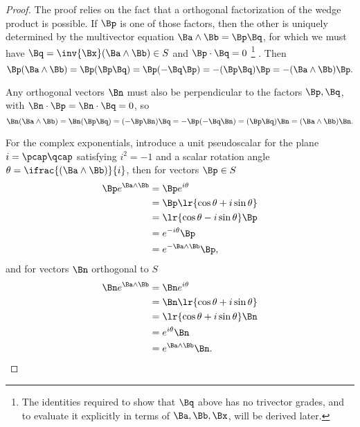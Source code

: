 \begin{proof}
The proof relies on the fact that a orthogonal factorization of the wedge product is possible.
If \( \Bp \) is one of those factors, then the other is uniquely determined by the multivector equation \( \Ba \wedge \Bb = \Bp \Bq \), for which we must have \( \Bq = \inv{\Bx}(\Ba \wedge \Bb) \in S \) and \( \Bp \cdot \Bq = 0 \)
\footnote{The identities required to show that \( \Bq \) above has no trivector grades, and to evaluate it explicitly in terms of \( \Ba, \Bb, \Bx \), will be derived later.}
.
Then
\begin{dmath}\label{eqn:generalRotation:1780}
\Bp (\Ba \wedge \Bb)
= \Bp (\Bp \Bq)
= \Bp (-\Bq \Bp)
= -(\Bp \Bq) \Bp
=
-(\Ba \wedge \Bb) \Bp.
\end{dmath}

Any orthogonal vectors \( \Bn \) must also be perpendicular to the factors \( \Bp, \Bq \), with \( \Bn \cdot \Bp = \Bn \cdot \Bq = 0 \), so
\begin{dmath}\label{eqn:generalRotation:1800}
\Bn (\Ba \wedge \Bb)
= \Bn (\Bp \Bq)
= (-\Bp \Bn) \Bq
= -\Bp (-\Bq \Bn)
= (\Bp \Bq) \Bn
=
(\Ba \wedge \Bb) \Bn.
\end{dmath}

For the complex exponentials, introduce a unit pseudoscalar for the plane \( i = \pcap \qcap \) satisfying \( i^2 = -1 \) and a scalar rotation angle \( \theta = \ifrac{ (\Ba \wedge \Bb) }{i} \), then for vectors \( \Bp \in S \)
\begin{equation}\label{eqn:generalRotation:1840}
\begin{aligned}
\Bp e^{ \Ba \wedge \Bb }
&= \Bp e^{ i \theta } \\
&= \Bp \lr{ \cos\theta + i \sin\theta } \\
&= \lr{ \cos\theta - i \sin\theta } \Bp \\
&= e^{-i\theta} \Bp \\
&= e^{- \Ba \wedge \Bb} \Bp,
\end{aligned}
\end{equation}
and for vectors \( \Bn \) orthogonal to \( S \)
\begin{equation}\label{eqn:generalRotation:1860}
\begin{aligned}
\Bn e^{ \Ba \wedge \Bb }
&= \Bn e^{ i \theta } \\
&= \Bn \lr{ \cos\theta + i \sin\theta } \\
&= \lr{ \cos\theta + i \sin\theta } \Bn \\
&= e^{i\theta} \Bn \\
&= e^{\Ba \wedge \Bb} \Bn.
\end{aligned}
\end{equation}
\end{proof}

